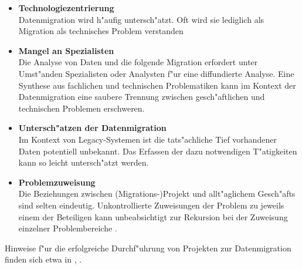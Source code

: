 \begin{itemize}
	\item \textbf{Technologiezentrierung} \\
			Datenmigration wird h"aufig untersch"atzt. Oft wird sie lediglich als Migration als technisches Problem verstanden \citep[S.~9]{morris-2012}
	\item \textbf{Mangel an Spezialisten} \\
			Die Analyse von Daten und die folgende Migration erfordert unter Umst"anden Spezialisten oder Analysten f"ur eine diffundierte Analyse. Eine Synthese aus fachlichen und technischen Problematiken kann im Kontext der Datenmigration eine saubere Trennung zwischen gesch"aftlichen und technischen Problemen erschweren.
	\item \textbf{Untersch"atzen der Datenmigration} \\
			Im Kontext von Legacy-Systemen ist die tats"achliche Tief vorhandener Daten potentiell unbekannt. Das Erfassen der dazu notwendigen T"atigkeiten kann so leicht untersch"atzt werden.
	\item \textbf{Problemzuweisung} \\
			Die Beziehungen zwischen (Migrations-)Projekt und allt"aglichem Gesch"afts sind selten eindeutig. Unkontrollierte Zuweisungen der Problem zu jeweils einem der Beteiligen kann unbeabsichtigt zur Rekursion bei der Zuweisung einzelner Problembereiche \citep[S.~9]{morris-2012}.
\end{itemize}

Hinweise f"ur die erfolgreiche Durchf"uhrung von Projekten zur Datenmigration finden sich etwa in \citep{sas-2009}, \citep{oracle-2011}.
